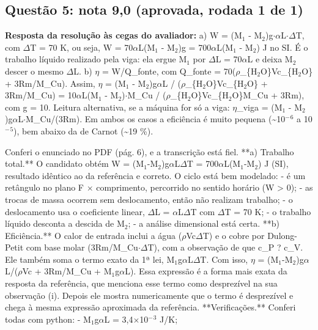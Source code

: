 \documentclass{article}%
\begin{document}
\subsection*{Questão 5: nota 9,0 (aprovada, rodada 1 de 1)}%
\textbf{Resposta da resolução às cegas do avaliador:} a) W = (M$_{1}$ - M$_{2}$)g$\cdot$$\alpha$L$\cdot$$\Delta$T, com $\Delta$T = 70 K, ou seja, W = 70$\alpha$L(M$_{1}$ - M$_{2}$)g = 700$\alpha$L(M$_{1}$ - M$_{2}$) J no SI. É o trabalho líquido realizado pela viga: ela ergue M$_{1}$ por $\Delta$L = 70$\alpha$L e deixa M$_{2}$ descer o mesmo $\Delta$L.\newline%
\newline%
b) $\eta$ = W/Q\_fonte, com Q\_fonte = 70($\rho$\_\{H$_{2}$O\}Vc\_\{H$_{2}$O\} + 3Rm/M\_Cu). Assim, $\eta$ = (M$_{1}$ - M$_{2}$)g$\alpha$L / ($\rho$\_\{H$_{2}$O\}Vc\_\{H$_{2}$O\} + 3Rm/M\_Cu) = 10$\alpha$L(M$_{1}$ - M$_{2}$)$\cdot$M\_Cu / ($\rho$\_\{H$_{2}$O\}Vc\_\{H$_{2}$O\}M\_Cu + 3Rm), com g = 10.\newline%
\newline%
Leitura alternativa, se a máquina for só a viga: $\eta$\_viga = (M$_{1}$ - M$_{2}$)g$\alpha$L$\cdot$M\_Cu/(3Rm). Em ambos os casos a eficiência é muito pequena (\textasciitilde{}10$^{-}$$^{6}$ a 10$^{-}$$^{5}$), bem abaixo da de Carnot (\textasciitilde{}19 \%).\par %
Conferi o enunciado no PDF (pág. 6), e a transcrição está fiel.\newline%
\newline%
**a) Trabalho total.** O candidato obtém W = (M$_{1}$-M$_{2}$)g$\alpha$L$\Delta$T = 700$\alpha$L(M$_{1}$-M$_{2}$) J (SI), resultado idêntico ao da referência e correto. O ciclo está bem modelado:\newline%
{-} é um retângulo no plano F $\times$ comprimento, percorrido no sentido horário (W > 0);\newline%
{-} as trocas de massa ocorrem sem deslocamento, então não realizam trabalho;\newline%
{-} o deslocamento usa o coeficiente linear, $\Delta$L = $\alpha$L$\Delta$T com $\Delta$T = 70 K;\newline%
{-} o trabalho líquido desconta a descida de M$_{2}$;\newline%
{-} a análise dimensional está certa.\newline%
\newline%
**b) Eficiência.** O calor de entrada inclui a água ($\rho$Vc$\Delta$T) e o cobre por Dulong{-}Petit com base molar (3Rm/M\_Cu$\cdot$$\Delta$T), com a observação de que c\_P ? c\_V. Ele também soma o termo exato da 1ª lei, M$_{1}$g$\alpha$L$\Delta$T. Com isso, $\eta$ = (M$_{1}$-M$_{2}$)g$\alpha$L/($\rho$Vc + 3Rm/M\_Cu + M$_{1}$g$\alpha$L). Essa expressão é a forma mais exata da resposta da referência, que menciona esse termo como desprezível na sua observação (i). Depois ele mostra numericamente que o termo é desprezível e chega à mesma expressão aproximada da referência.\newline%
\newline%
**Verificações.** Conferi todas com python:\newline%
{-} M$_{1}$g$\alpha$L = 3,4$\times$10$^{-}$$^3$ J/K;\newline%
\end{document}
